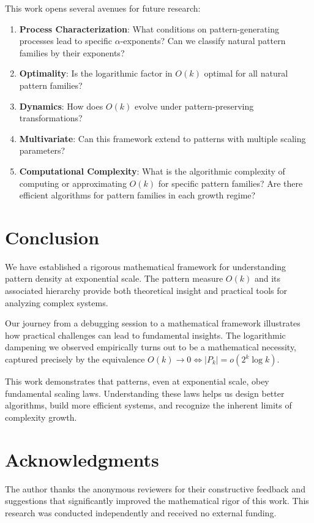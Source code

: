\documentclass[11pt]{article}
\theoremstyle{definition}
\begin{document}
This work opens several avenues for future research:

\begin{enumerate}
\item \textbf{Process Characterization}: What conditions on pattern-generating processes lead to specific $\alpha$-exponents? Can we classify natural pattern families by their exponents?
\item \textbf{Optimality}: Is the logarithmic factor in $O(k)$ optimal for all natural pattern families?
\item \textbf{Dynamics}: How does $O(k)$ evolve under pattern-preserving transformations?
\item \textbf{Multivariate}: Can this framework extend to patterns with multiple scaling parameters?
\item \textbf{Computational Complexity}: What is the algorithmic complexity of computing or approximating $O(k)$ for specific pattern families? Are there efficient algorithms for pattern families in each growth regime?
\end{enumerate}

\section{Conclusion}

We have established a rigorous mathematical framework for understanding pattern density at exponential scale. The pattern measure $O(k)$ and its associated hierarchy provide both theoretical insight and practical tools for analyzing complex systems.

Our journey from a debugging session to a mathematical framework illustrates how practical challenges can lead to fundamental insights. The logarithmic dampening we observed empirically turns out to be a mathematical necessity, captured precisely by the equivalence $O(k)\to 0\iff |P_k|=o(2^k\log k)$.

This work demonstrates that patterns, even at exponential scale, obey fundamental scaling laws. Understanding these laws helps us design better algorithms, build more efficient systems, and recognize the inherent limits of complexity growth.

\section*{Acknowledgments}

The author thanks the anonymous reviewers for their constructive feedback and suggestions that significantly improved the mathematical rigor of this work. This research was conducted independently and received no external funding.
\end{document}

